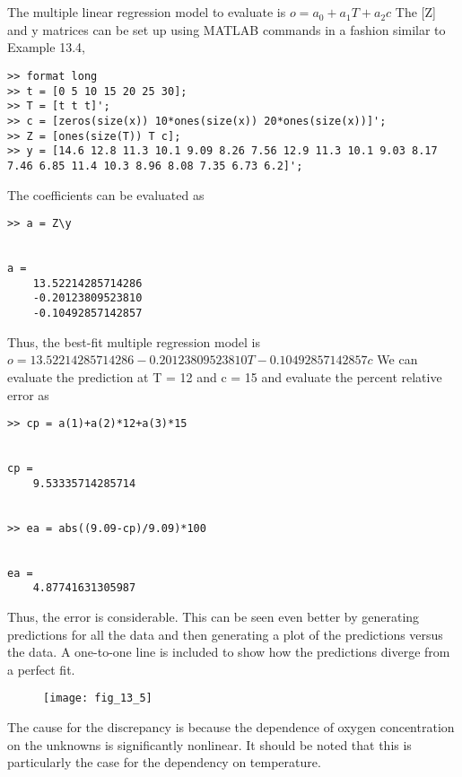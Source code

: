 \documentclass[../main.tex]{subfiles}
\begin{document}
\section{}
The multiple linear regression model to evaluate is
	\bigbreak
$o=a_{0}+a_{1} T+a_{2} c$
	\bigbreak
The [Z] and y matrices can be set up using MATLAB commands in a fashion similar to
Example 13.4,
	\bigbreak
\begin{lstlisting}[numbers=none]
>> format long
>> t = [0 5 10 15 20 25 30];
>> T = [t t t]';
>> c = [zeros(size(x)) 10*ones(size(x)) 20*ones(size(x))]';
>> Z = [ones(size(T)) T c];
>> y = [14.6 12.8 11.3 10.1 9.09 8.26 7.56 12.9 11.3 10.1 9.03 8.17
7.46 6.85 11.4 10.3 8.96 8.08 7.35 6.73 6.2]';
\end{lstlisting}
	\bigbreak
The coefficients can be evaluated as 
	\bigbreak
\begin{lstlisting}[numbers=none]
>> a = Z\y


a =
	13.52214285714286
	-0.20123809523810
	-0.10492857142857 
\end{lstlisting}
	\bigbreak
Thus, the best-fit multiple regression model is 
	\bigbreak
$o=13.52214285714286-0.20123809523810 T-0.10492857142857 c$
	\bigbreak
	We can evaluate the prediction at T = 12 and c = 15 and evaluate the percent relative error as
	\bigbreak
\begin{lstlisting}[numbers=none]
>> cp = a(1)+a(2)*12+a(3)*15


cp =
 	9.53335714285714


>> ea = abs((9.09-cp)/9.09)*100


ea =
	4.87741631305987
\end{lstlisting}
	\bigbreak
\begin{blockquote}
Thus, the error is considerable. This can be seen even better by generating predictions for
all the data and then generating a plot of the predictions versus the data. A one-to-one line
is included to show how the predictions diverge from a perfect fit. 
\end{blockquote}
	\bigbreak
	\begin{figure}[H]
		\texttt{[image: fig\_13\_5]}
		\label{fig:fig_13_5}
	\end{figure}
	\bigbreak
\begin{blockquote}
The cause for the discrepancy is because the dependence of oxygen concentration on the
unknowns is significantly nonlinear. It should be noted that this is particularly the case for
the dependency on temperature. 
\end{blockquote}
	\bigbreak
\end{document}

